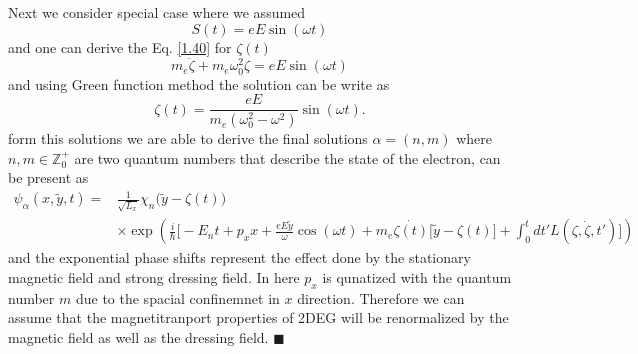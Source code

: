 \vspace{5mm}
\noindent
Next we consider special case where we assumed
\begin{equation} \label{1.49}
  S(t) = eE\sin(\omega t)
\end{equation}
and one can derive the Eq. \eqref{1.40} for $\zeta(t)$
\begin{equation} \label{1.50}
  m_e\ddot{\zeta} + m_e\omega_0^2\zeta = eE\sin(\omega t)
\end{equation}
and using Green function method the solution can be write as
\begin{equation} \label{1.51}
  \zeta(t) = \frac{eE}{m_e(\omega_0^2 - \omega^2)}\sin(\omega t).
\end{equation}
form this solutions we are able to derive the final solutions $\alpha=(n,m)$ where $n,m \in \mathbb{Z}^{+}_0$ are two quantum numbers that describe the state of the electron, can be present as
\begin{equation} \label{1.52}
  \begin{aligned}
    \psi_{\alpha}(x,\tilde{y},t)  = & \frac{1}{\sqrt{L_x}} \chi_n\big(\tilde{y} - \zeta(t)\big) \\
    & \times
      \exp(
     \frac{i}{\hbar}\bigg[- E_nt +
    p_x x +
    \frac{eE\tilde{y}}{\omega}\cos(\omega t)+
    m_e\dot{\zeta(t)}\big[\tilde{y}-\zeta(t)\big]
     + \int_0^{t}dt'L(\zeta,\dot{\zeta},t')\bigg])
  \end{aligned}
\end{equation}
and the exponential phase shifts represent the effect done by the stationary magnetic field and strong dressing field. In here $p_x$ is qunatized with the quantum number $m$ due to the spacial confinemnet in $x$ direction. Therefore we can assume that the magnetitranport properties of 2DEG will be renormalized by the magnetic field as well as the dressing field.
\hfill$\blacksquare$
